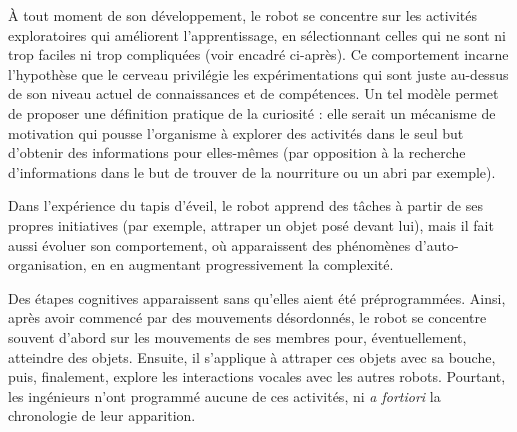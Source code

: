 \vspace{4pt}

À tout moment de son développement, le robot se concentre sur les activités exploratoires qui améliorent l’apprentissage, en sélectionnant celles qui ne sont ni trop faciles ni trop compliquées (voir encadré ci-après). Ce comportement incarne l’hypothèse que le cerveau privilégie les expérimentations qui sont juste au-dessus de son niveau actuel de connaissances et de compétences. Un tel modèle permet de proposer une définition pratique de la curiosité : elle serait un mécanisme de motivation qui pousse l’organisme à explorer des activités dans le seul but d’obtenir des informations pour elles-mêmes (par opposition à la recherche d’informations dans le but de trouver de la nourriture ou un abri par exemple).

Dans l’expérience du tapis d’éveil, le robot apprend des tâches à partir de ses propres initiatives (par exemple, attraper un objet posé devant lui), mais il fait aussi évoluer son comportement, où apparaissent des phénomènes d’auto-organisation, en en augmentant progressivement la complexité.

Des étapes cognitives apparaissent sans qu’elles aient été préprogrammées. Ainsi, après avoir commencé par des mouvements désordonnés, le robot se concentre souvent d’abord sur les mouvements de ses membres pour, éventuellement, atteindre des objets. Ensuite, il s’applique à attraper ces objets avec sa bouche, puis, finalement, explore les interactions vocales avec les autres robots. Pourtant, les ingénieurs n’ont programmé aucune de ces activités, ni \textit{a fortiori} la chronologie de leur apparition.

